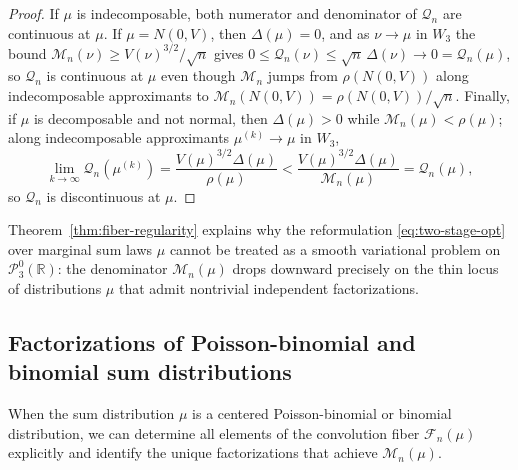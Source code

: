 \documentclass[11pt]{article}
\numberwithin{equation}{section}
\theoremstyle{definition}
\theoremstyle{remark}
\newcommand{\R}{\mathbb R}
\begin{document}
\begin{proof}
If $\mu$ is indecomposable, both numerator and denominator of $\mathcal Q_n$
are continuous at $\mu$. If $\mu=N(0,V)$, then $\Delta(\mu)=0$, and as
$\nu\to\mu$ in $W_3$ the bound $\mathcal M_n(\nu)\ge V(\nu)^{3/2}/\sqrt n$
gives $0\le\mathcal Q_n(\nu)\le\sqrt n\,\Delta(\nu)\to0=\mathcal Q_n(\mu)$,
so $\mathcal Q_n$ is continuous at $\mu$ even though $\mathcal M_n$ jumps from
$\rho(N(0,V))$ along indecomposable approximants to
$\mathcal M_n(N(0,V))=\rho(N(0,V))/\sqrt n$. Finally, if $\mu$ is decomposable
and not normal, then $\Delta(\mu)>0$ while $\mathcal M_n(\mu)<\rho(\mu)$;
along indecomposable approximants $\mu^{(k)}\to\mu$ in $W_3$,
\[
 \lim_{k\to\infty}\mathcal Q_n(\mu^{(k)})
 =\frac{V(\mu)^{3/2}\Delta(\mu)}{\rho(\mu)}
 <\frac{V(\mu)^{3/2}\Delta(\mu)}{\mathcal M_n(\mu)}=\mathcal Q_n(\mu),
\]
so $\mathcal Q_n$ is discontinuous at $\mu$.
\end{proof}

Theorem~\ref{thm:fiber-regularity} explains why the reformulation
\eqref{eq:two-stage-opt} over marginal sum laws $\mu$ cannot be treated as a
smooth variational problem on $\mathcal P_3^0(\R)$: the denominator
$\mathcal M_n(\mu)$ drops downward precisely on the thin locus of
distributions $\mu$ that admit nontrivial independent factorizations.

\subsection{Factorizations of Poisson-binomial and binomial sum distributions}

When the sum distribution $\mu$ is a centered Poisson-binomial or binomial
distribution, we can determine all elements of the convolution fiber
$\mathcal F_n(\mu)$ explicitly and identify the unique factorizations that
achieve $\mathcal M_n(\mu)$.
\end{document}
